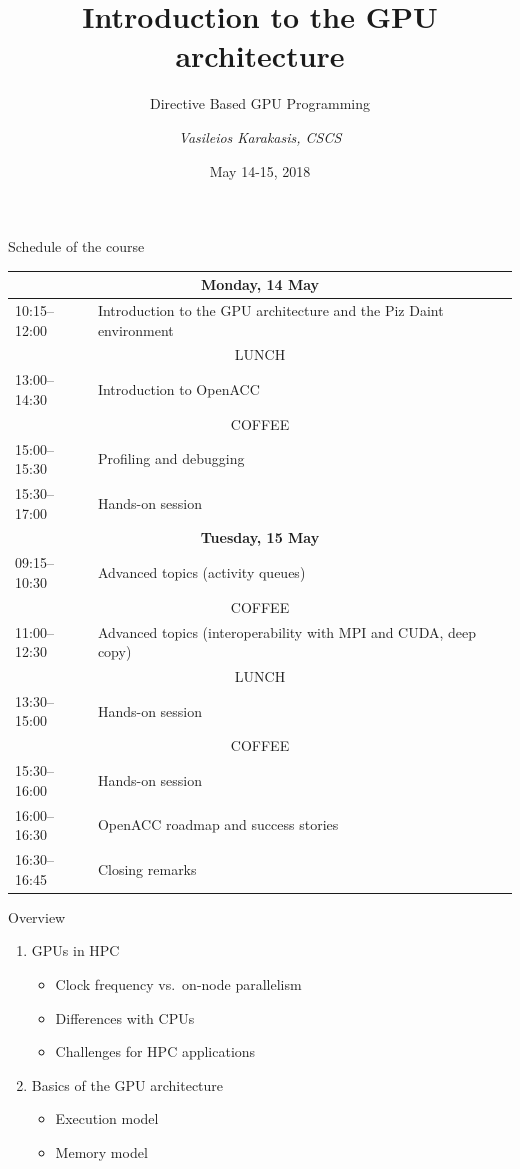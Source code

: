 \documentclass[aspectratio=169,12pt]{beamer}
\author{\emph{Vasileios Karakasis, CSCS}}
\title{Introduction to the GPU architecture}
\subtitle{Directive Based GPU Programming}
\date{May 14-15, 2018}
\begin{document}
\cscstitle

\begin{frame}{Schedule of the course}
  \tiny
  \renewcommand\arraystretch{1.2}
  \begin{table}
    \centering
    \begin{tabular}{ll}
      \multicolumn{2}{c}{\bfseries Monday, 14 May} \\\hline
      10:15--12:00 & Introduction to the GPU architecture and the Piz Daint environment \\\hline
      \multicolumn{2}{c}{\tiny LUNCH} \\\hline
      13:00--14:30 & Introduction to OpenACC \\\hline
      \multicolumn{2}{c}{\tiny COFFEE} \\\hline
      15:00--15:30 & Profiling and debugging \\
      15:30--17:00 & Hands-on session \\\hline
      \multicolumn{2}{c}{\bfseries Tuesday, 15 May} \\\hline
      09:15--10:30 & Advanced topics (activity queues) \\\hline
      \multicolumn{2}{c}{\tiny COFFEE} \\\hline
      11:00--12:30 & Advanced topics (interoperability with MPI and CUDA, deep copy) \\\hline
      \multicolumn{2}{c}{\tiny LUNCH} \\\hline
      13:30--15:00 & Hands-on session \\\hline
      \multicolumn{2}{c}{\tiny COFFEE} \\\hline
      15:30--16:00 & Hands-on session \\
      16:00--16:30 & OpenACC roadmap and success stories \\
      16:30--16:45 & Closing remarks \\
    \end{tabular}
  \end{table}
\end{frame}


\begin{frame}{Overview}
  \begin{enumerate}
  \item GPUs in HPC
    \begin{itemize}
    \item Clock frequency vs.\ on-node parallelism
    \item Differences with CPUs
    \item Challenges for HPC applications
    \end{itemize}
    \vspace\baselineskip
  \item Basics of the GPU architecture
    \begin{itemize}
    \item Execution model
    \item Memory model
    \end{itemize}
  \end{enumerate}
\end{frame}
\end{document}
